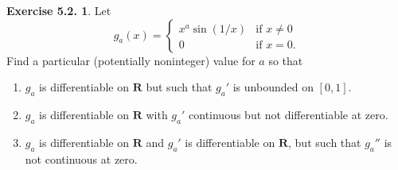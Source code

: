 \documentclass[12pt]{article}
\theoremstyle{definition}
\theoremstyle{exercise}
\newtheorem{exercise}{Exercise 5.2.}
\theoremstyle{solution}
\newcommand{\R}{\mathbf{R}}
\begin{document}
\begin{exercise}
\label{ex:7}
    Let
    \[
        g_a(x) = \begin{cases}
            x^a \sin(1/x) & \text{if } x \neq 0 \\
            0 & \text{if } x = 0.
        \end{cases}
    \]
    Find a particular (potentially noninteger) value for \( a \) so that
    \begin{enumerate}
        \item \( g_a \) is differentiable on \( \R \) but such that \( g_a' \) is unbounded on \( [0, 1] \).

        \item \( g_a \) is differentiable on \( \R \) with \( g_a' \) continuous but not differentiable at zero.

        \item \( g_a \) is differentiable on \( \R \) and \( g_a' \) is differentiable on \( \R \), but such that \( g_a'' \) is not continuous at zero.
    \end{enumerate}
\end{exercise}
\end{document}

